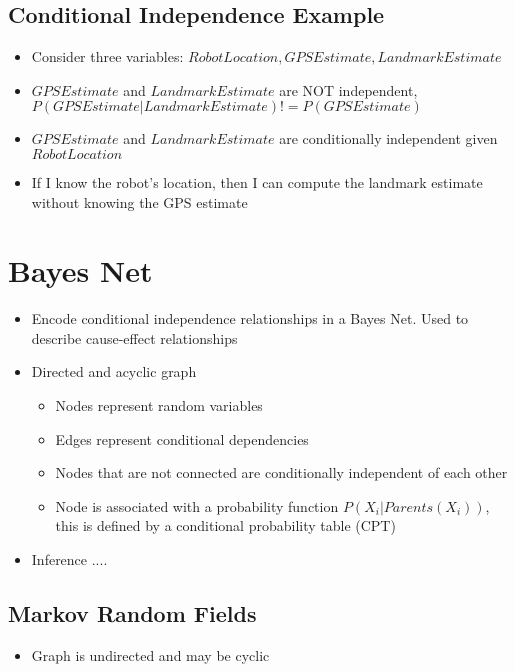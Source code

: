 \documentclass[../main.tex]{subfiles}
\begin{document}
\subsection{Conditional Independence Example}
    \begin{itemize}
      \item Consider three variables: $RobotLocation, GPSEstimate, LandmarkEstimate$
      \item $GPSEstimate$ and $LandmarkEstimate$  are NOT independent, $P(GPSEstimate|LandmarkEstimate) != P(GPSEstimate)$
      \item $GPSEstimate$ and $LandmarkEstimate$ are conditionally independent given $RobotLocation$
      \item If I know the robot's location, then I can compute the landmark estimate without knowing the GPS estimate
    \end{itemize}

\section{Bayes Net}
    \begin{itemize}
      \item Encode conditional independence relationships in a Bayes Net. Used to describe cause-effect relationships
      \item Directed and acyclic graph
      \begin{itemize}
        \item Nodes represent random variables
        \item Edges represent conditional dependencies
        \item Nodes that are not connected are conditionally independent of each other
        \item Node is associated with a probability function $P(X_{i} | Parents(X_{i}))$, this is defined by a conditional probability table (CPT)
      \end{itemize}
      \item Inference ....
    \end{itemize}

\subsection{Markov Random Fields}
    \begin{itemize}
      \item Graph is undirected and may be cyclic
    \end{itemize}
\end{document}
